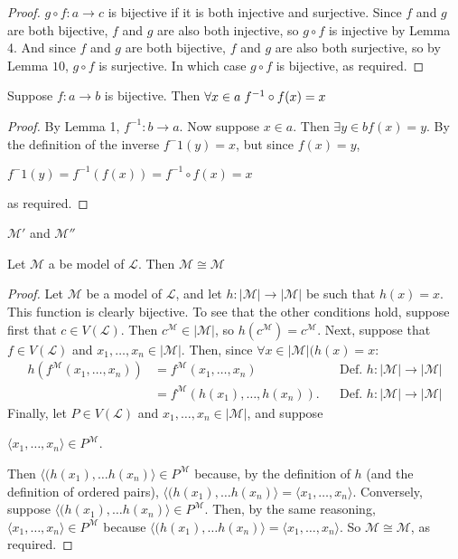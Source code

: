 \documentclass{article}
\begin{document}
\begin{proof} $g \circ f: a \rightarrow c$ is bijective if it is both injective and surjective. Since $f$ and $g$ are both bijective, $f$ and $g$ are also both injective, so $g \circ f$ is injective by Lemma 4. And since $f$ and $g$ are both bijective, $f$ and $g$ are also both surjective, so by Lemma $10$, $g \circ f$ is surjective. In which case $g \circ f$ is bijective, as required. 
\end{proof}
\begin{lemma} Suppose $f: a \rightarrow b$ is bijective. Then $\forall x \in a \hspace{0.1cm} f^{-1} \circ f(x) = x$ \end{lemma}
\begin{proof} By Lemma 1, $f^{-1}: b \rightarrow a$. Now suppose $x \in a$. Then $\exists y \in b f(x) = y$. By the definition of the inverse $f^-1(y) = x$, but since $f(x) = y$, \begin{center}
$f^-1(y) = f^{-1}(f(x)) = f^{-1} \circ f(x) = x$ \end{center} as required. \end{proof}
$\mathcal{M'}$ and $\mathcal{M''}$ 
\begin{proposition} 
Let $\mathcal{M}$ a  be model of $\mathscr{L}$. Then $\mathcal{M} \cong \mathcal{M}$ 
\end{proposition}
\begin{proof} 
Let $\mathcal{M}$ be a model of $\mathscr{L}$, and let $h: | \mathcal{M} | \rightarrow | \mathcal{M} |$ be such that $h(x) = x$. This function is clearly bijective. To see that the other conditions hold, suppose first that $c \in V(\mathscr{L})$. Then $c^\mathcal{M} \in | \mathcal{M} |$, so $h(c^\mathcal{M}) = c^\mathcal{M}$. Next, suppose that $f \in V(\mathscr{L})$ and  $x_1, \ldots, x_n \in | \mathcal{M}|$. Then, since $\forall x \in |\mathcal{M}| (h(x) = x$:
 \begin{align*} 
 h(f^\mathcal{M}(x_1, \ldots, x_n)) &= f^\mathcal{M}(x_1, \ldots, x_n)&&\text{Def. $h: | \mathcal{M} | \rightarrow | \mathcal{M} |$}\\
 &= f^\mathcal{M}(h(x_1), \ldots,h(x_n)).&&\text{Def.  $h: | \mathcal{M} | \rightarrow | \mathcal{M} |$}
 \end{align*} Finally, let $P \in V(\mathscr{L})$ and $x_1, \ldots, x_n \in |\mathcal{M}|$, and suppose \begin{center} $\langle x_1,\ldots, x_n \rangle \in P^\mathcal{M}$. \end{center} Then $\langle (h(x_1), \ldots h(x_n) \rangle \in P^\mathcal{M}$ because, by the definition of $h$ (and the definition of ordered pairs), $\langle (h(x_1), \ldots h(x_n) \rangle  = \langle x_1,\ldots, x_n \rangle$. Conversely, suppose $\langle (h(x_1), \ldots h(x_n) \rangle \in P^\mathcal{M}$. Then, by the same reasoning, $\langle x_1,\ldots, x_n \rangle \in P^\mathcal{M}$ because $\langle (h(x_1), \ldots h(x_n) \rangle =  \langle x_1,\ldots, x_n \rangle$. So $\mathcal{M} \cong  \mathcal{M}$, as required.
\end{proof} \clearpage 
\end{document}
